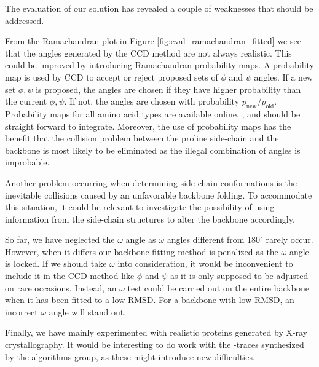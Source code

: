 The evaluation of our solution has revealed a couple of weaknesses that should be addressed. 

From the Ramachandran plot in Figure \ref{fig:eval_ramachandran_fitted} we see that the angles generated by the CCD method are not always realistic.
This could be improved by introducing Ramachandran probability maps.
A probability map is used by CCD to accept or reject proposed sets of $\phi$ and $\psi$ angles.
If a new set $\phi,\psi$ is proposed, the angles are chosen if they have higher probability than the current $\phi,\psi$.
If not, the angles are chosen with probability $p_{\text{new}}/p_{\text{old}}$. 
Probability maps for all amino acid types are available online, \cite{10.1371/journal.pcbi.1000763}, and should be straight forward to integrate.
Moreover, the use of probability maps has the benefit that the collision problem between the proline side-chain and the backbone is most likely to be eliminated as the illegal combination of angles is improbable. 

Another problem occurring when determining side-chain conformations is the inevitable collisions caused by an unfavorable backbone folding. 
To accommodate this situation, it could be relevant to investigate the possibility of using information from the side-chain structures to alter the backbone accordingly. 

So far, we have neglected the $\omega$ angle as $\omega$ angles different from 180$^\circ$ rarely occur. 
However, when it differs our backbone fitting method is penalized as the $\omega$ angle is locked.
If we should take $\omega$ into consideration, it would be inconvenient to include it in the CCD method like $\phi$ and $\psi$ as it is only supposed to be adjusted on rare occasions.
Instead, an $\omega$ test could be carried out on the entire backbone when it has been fitted to a low RMSD.
For a backbone with low RMSD, an incorrect $\omega$ angle will stand out.

Finally, we have mainly experimented with realistic proteins generated by X-ray crystallography. 
It would be interesting to do work with the \Ca-traces synthesized by the algorithms group, as these might introduce new difficulties.
\newpage



